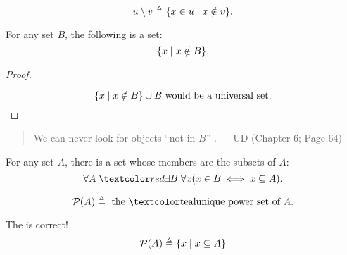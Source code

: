 \begin{frame}{}
  \begin{definition}
    \[
      u \setminus v \triangleq \{x \in u \mid x \notin v\}.
    \]
  \end{definition}

  \pause
  \begin{theorem}
    For any set $B$, the following is  a set:
    \[
      \{x \mid x \notin B\}.
    \]
  \end{theorem}

  \pause
  \begin{proof}
    \begin{center}
    \end{center}

    \pause
    \vspace{-0.50cm}
    \[
      \{x \mid x \notin B\} \cup B \text{ would be a universal set}.
    \]
  \end{proof}

  \pause
  \begin{quote}
    We can never look for objects ``not in $B$'' .
    \hfill --- UD (Chapter 6; Page 64)
  \end{quote}
\end{frame}

\begin{frame}{}
  \begin{axiom}
    For any set $A$, there is a set whose members are the subsets of $A$:
    \[
      \forall A\; \red{\exists B}\; \forall x (x \in B \iff x \subseteq A).
    \]
  \end{axiom}

  \pause
  \vspace{0.50cm}
  \begin{definition}[``$\mathcal{P}(A)$'']
    \[
      \mathcal{P}(A) \triangleq \text{ the \teal{unique} power set of } A.
    \]
  \end{definition}

  \pause
  \vspace{0.50cm}
  \begin{alertblock}{The is  correct!}
    \[
      \mathcal{P}(A) \triangleq \{x \mid x \subseteq A\}
    \]
  \end{alertblock}
\end{frame}
